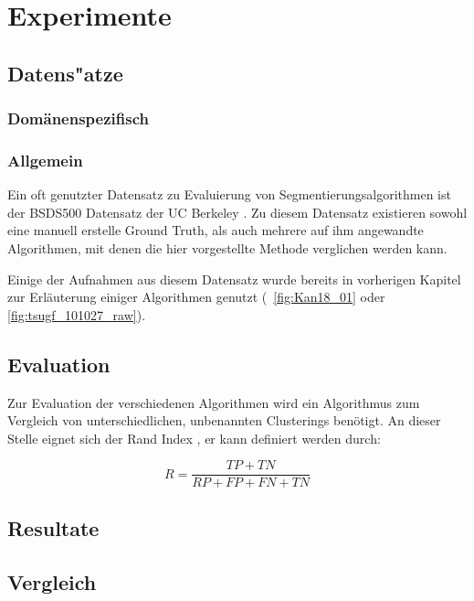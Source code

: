 \chapter{Experimente}
\label{chap:experiments}

\section{Datens"atze}
\label{sec:datasets}

\subsection{Domänenspezifisch}

\subsection{Allgemein}

Ein oft genutzter Datensatz zu Evaluierung von Segmentierungsalgorithmen ist der BSDS500 Datensatz der UC Berkeley \cite{bsd500}. Zu diesem Datensatz existieren sowohl eine manuell erstelle Ground Truth, als auch mehrere auf ihm angewandte Algorithmen, mit denen die hier vorgestellte Methode verglichen werden kann.

Einige der Aufnahmen aus diesem Datensatz wurde bereits in vorherigen Kapitel zur Erläuterung einiger Algorithmen genutzt (\vgl \bspw \figurename~\ref{fig:Kan18_01} oder \ref{fig:tsugf_101027_raw}).

\section{Evaluation}
\label{sec:evaluation}

Zur Evaluation der verschiedenen Algorithmen wird ein Algorithmus zum Vergleich von unterschiedlichen, unbenannten Clusterings benötigt. An dieser Stelle eignet sich der Rand Index \cite{menezes_17}, er kann definiert werden durch:

\begin{equation}
R = \frac{TP+TN}{RP+FP+FN+TN}
\end{equation}

\section{Resultate}
\label{sec:results}

\section{Vergleich}
\label{sec:comparision}


